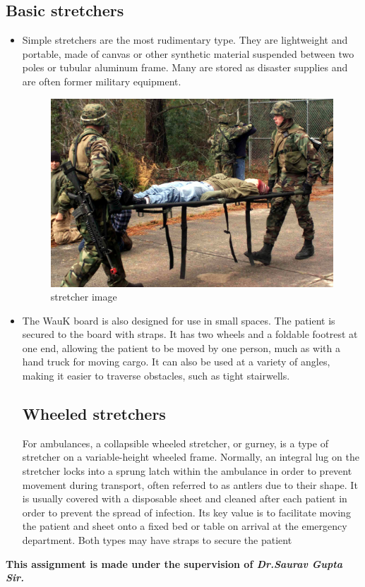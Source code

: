 \documentclass[12pt]{article}
\begin{document}
\subsection{Basic stretchers}
\begin{itemize}


\item Simple stretchers are the most rudimentary type. They are lightweight and portable, made of canvas or other synthetic material suspended between two poles or tubular aluminum frame. Many are stored as disaster supplies and are often former military equipment.
\begin{figure}[h]
\centering
\includegraphics[scale=0.1]{str.jpg}
\caption{stretcher image}
\end{figure}

\item The WauK board is also designed for use in small spaces. The patient is secured to the board with straps. It has two wheels and a foldable footrest at one end, allowing the patient to be moved by one person, much as with a hand truck for moving cargo. It can also be used at a variety of angles, making it easier to traverse obstacles, such as tight stairwells.\\

\subsection{Wheeled stretchers} 
For ambulances, a collapsible wheeled stretcher, or gurney, is a type of stretcher on a variable-height wheeled frame. Normally, an integral lug on the stretcher locks into a sprung latch within the ambulance in order to prevent movement during transport, often referred to as antlers due to their shape. It is usually covered with a disposable sheet and cleaned after each patient in order to prevent the spread of infection. Its key value is to facilitate moving the patient and sheet onto a fixed bed or table on arrival at the emergency department. Both types may have straps to secure the patient

\end{itemize}




\textbf{This assignment is made under the supervision of
\emph{Dr.Saurav Gupta Sir.}}
\end{document}
